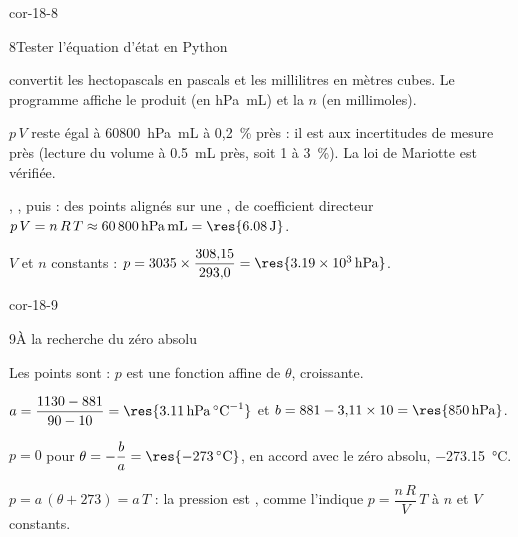 \begin{blocLivre}{cor-18-8}
\begin{corrige}{8}{Tester l'équation d'état en Python}
\begin{questions}
\item {} convertit les hectopascals en pascals et  les millilitres en mètres cubes. Le programme affiche
le produit  (en \unit{hPa.mL}) et la  $n$ (en millimoles).
\item $p\,V$ reste égal à \qty{60800}{hPa.mL} à 0,2~\% près : il est  aux incertitudes de mesure près
(lecture du volume à \qty{0,5}{mL} près, soit 1 à 3~\%). La loi de Mariotte est vérifiée.
\item {}, , puis  : des points alignés sur une
, de coefficient directeur $p\,V=n\,R\,T\approx\qty{60800}{hPa.mL}=\res{\qty{6,08}{J}}$.
\item $V$ et $n$ constants : $p=3035\times\dfrac{308{,}15}{293{,}0}=\res{\qty{3,19e3}{hPa}}$.
\end{questions}
\end{corrige}
\end{blocLivre}
\begin{blocLivre}{cor-18-9}
\begin{corrige}{9}{À la recherche du zéro absolu}
\begin{questions}
\item Les points sont  : $p$ est une fonction affine de $\theta$, croissante.
\item $a=\dfrac{1130-881}{90-10}=\res{\qty{3,11}{hPa.\degreeCelsius^{-1}}}$ et $b=881-3{,}11\times10=\res{\qty{850}{hPa}}$.
\item $p=0$ pour $\theta=-\dfrac{b}{a}=\res{\qty{-273}{\degreeCelsius}}$, en accord avec le zéro absolu, \qty{-273,15}{\degreeCelsius}.
\item $p=a\,(\theta+273)=a\,T$ : la pression est , comme l'indique $p=\dfrac{n\,R}{V}\,T$ à $n$ et
$V$ constants.
\end{questions}
\end{corrige}
\end{blocLivre}
